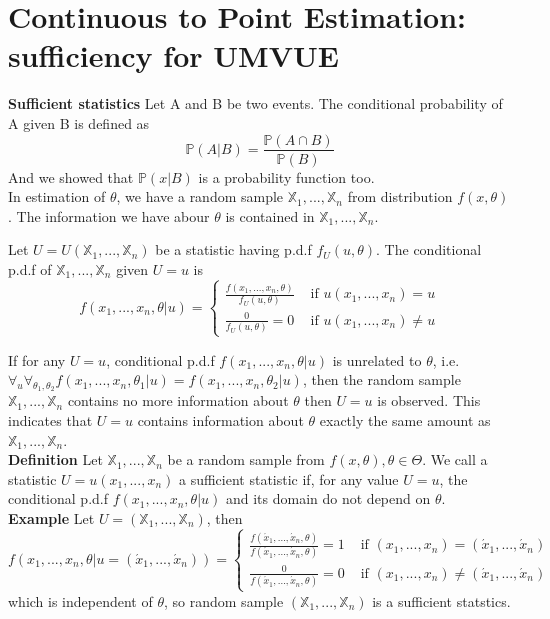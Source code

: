 \section{Continuous to Point Estimation: sufficiency for UMVUE}

\textbf{Sufficient statistics}
Let A and B be two events. The conditional probability of A given B is defined as
$$\mathbb{P}(A|B) = \frac{\mathbb{P}(A\cap B)}{\mathbb{P}(B)}$$
And we showed that $\mathbb{P}(x|B)$ is a probability function too.\\

In estimation of $\theta$, we have a random sample $\mathbb{X}_1, ..., \mathbb{X}_n$ from distribution $f(x, \theta)$. The information we have abour $\theta$ is contained in $\mathbb{X}_1, ..., \mathbb{X}_n$.

Let $U = U(\mathbb{X}_1, ..., \mathbb{X}_n)$ be a statistic having p.d.f $f_U(u, \theta)$. The conditional p.d.f of $\mathbb{X}_1, ..., \mathbb{X}_n$ given $U=u$ is
$$f( x_1, ..., x_n, \theta | u ) = 
\begin{cases}
\frac{f(x_1, ..., x_n, \theta)}{f_U(u, \theta)} & \text{ if } u(x_1, ..., x_n) = u \\
\frac{0}{f_U(u, \theta)} = 0 & \text{ if } u(x_1, ..., x_n) \neq u
\end{cases}$$

If for any $U = u$, conditional p.d.f $f(x_1, ..., x_n, \theta | u)$ is unrelated to $\theta$, i.e. $\forall_u\forall_{\theta_1, \theta_2} f(x_1, ..., x_n, \theta_1 | u) = f(x_1, ..., x_n, \theta_2 | u)$, then the random sample $\mathbb{X}_1, ..., \mathbb{X}_n$ contains no more information about $\theta$ then $U=u$ is observed. This indicates that $U=u$ contains information about $\theta$ exactly the same amount as $\mathbb{X}_1, ..., \mathbb{X}_n$.\\

\textbf{Definition} Let $\mathbb{X}_1, ..., \mathbb{X}_n$ be a random sample from $f(x, \theta), \theta\in\Theta$. We call a statistic $U=u(x_1, ..., x_n)$ a sufficient statistic if, for any value $U=u$, the conditional p.d.f $f(x_1, ..., x_n, \theta | u)$ and its domain do not depend on $\theta$.\\

\textbf{Example} Let $U = (\mathbb{X}_1, ..., \mathbb{X}_n)$, then
$$f(x_1, ..., x_n, \theta | u = (\acute{x}_1, ..., \acute{x}_n)) = 
\begin{cases}
\frac{f(\acute{x}_1, ..., \acute{x}_n, \theta)}{f(\acute{x}_1, ..., \acute{x}_n, \theta)} = 1 & \text{ if } (x_1, ..., x_n) = (\acute{x}_1, ..., \acute{x}_n) \\
\frac{0}{f(\acute{x}_1, ..., \acute{x}_n, \theta)} = 0 & \text{ if } (x_1, ..., x_n) \neq (\acute{x}_1, ..., \acute{x}_n)
\end{cases}
$$
which is independent of $\theta$, so random sample $(\mathbb{X}_1, ..., \mathbb{X}_n)$ is a sufficient statstics.\\

